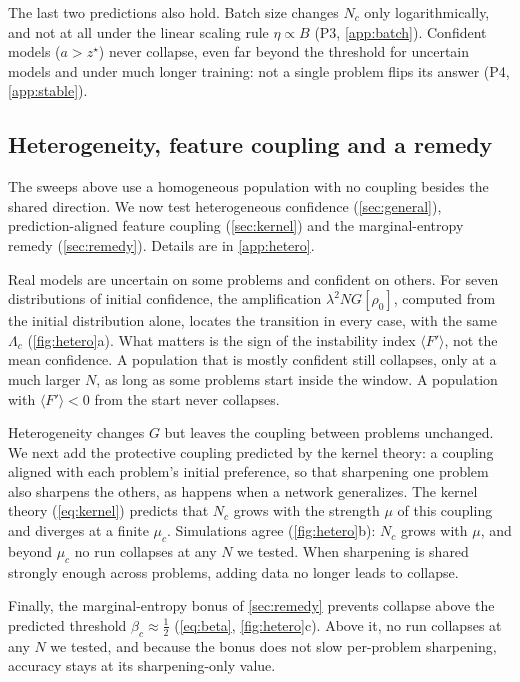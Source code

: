 The last two predictions also hold.
Batch size changes $N_c$ only logarithmically, and not at all under the linear scaling rule $\eta\propto B$ (P3, \cref{app:batch}).
Confident models ($a>z^\star$) never collapse, even far beyond the threshold for uncertain models and under much longer training: not a single problem flips its answer (P4, \cref{app:stable}).

\subsection{Heterogeneity, feature coupling and a remedy}
\label{sec:hetero}
The sweeps above use a homogeneous population with no coupling besides the shared direction. We now test heterogeneous confidence (\cref{sec:general}), prediction-aligned feature coupling (\cref{sec:kernel}) and the marginal-entropy remedy (\cref{sec:remedy}). Details are in \cref{app:hetero}.

Real models are uncertain on some problems and confident on others.
For seven distributions of initial confidence, the amplification $\lambda^2NG[\rho_0]$, computed from the initial distribution alone, locates the transition in every case, with the same $\Lambda_c$ (\cref{fig:hetero}a).
What matters is the sign of the instability index $\langle F'\rangle$, not the mean confidence. A population that is mostly confident still collapses, only at a much larger $N$, as long as some problems start inside the window. A population with $\langle F'\rangle<0$ from the start never collapses.

Heterogeneity changes $G$ but leaves the coupling between problems unchanged. We next add the protective coupling predicted by the kernel theory: a coupling aligned with each problem's initial preference, so that sharpening one problem also sharpens the others, as happens when a network generalizes.
The kernel theory (\cref{eq:kernel}) predicts that $N_c$ grows with the strength $\mu$ of this coupling and diverges at a finite $\mu_c$.
Simulations agree (\cref{fig:hetero}b): $N_c$ grows with $\mu$, and beyond $\mu_c$ no run collapses at any $N$ we tested.
When sharpening is shared strongly enough across problems, adding data no longer leads to collapse.

Finally, the marginal-entropy bonus of \cref{sec:remedy} prevents collapse above the predicted threshold $\beta_c\approx\tfrac12$ (\cref{eq:beta}, \cref{fig:hetero}c).
Above it, no run collapses at any $N$ we tested, and because the bonus does not slow per-problem sharpening, accuracy stays at its sharpening-only value.

